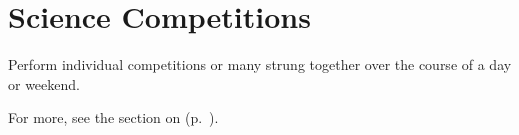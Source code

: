 

\section{Science Competitions} 
Perform individual competitions or many strung together over the course of a day or weekend. 

For more, see the section on  (p.~\pageref{cha:sci-comp}).

